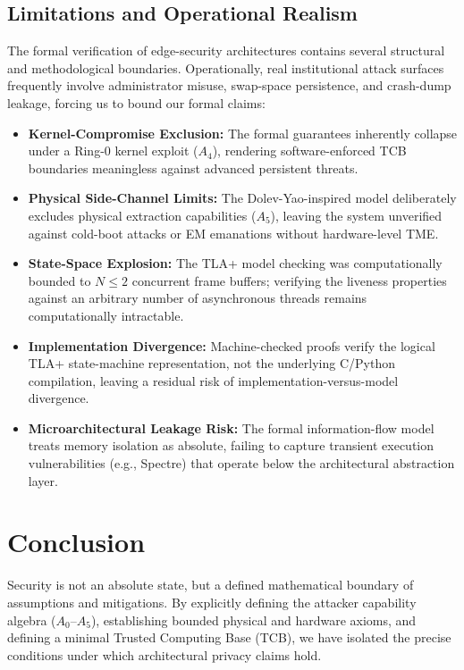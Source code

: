 \documentclass[conference]{IEEEtran}
\begin{document}
\subsection{Limitations and Operational Realism}
The formal verification of edge-security architectures contains several structural and methodological boundaries. Operationally, real institutional attack surfaces frequently involve administrator misuse, swap-space persistence, and crash-dump leakage, forcing us to bound our formal claims:
\begin{itemize}
    \item \textbf{Kernel-Compromise Exclusion:} The formal guarantees inherently collapse under a Ring-0 kernel exploit ($A_4$), rendering software-enforced TCB boundaries meaningless against advanced persistent threats.
    \item \textbf{Physical Side-Channel Limits:} The Dolev-Yao-inspired model deliberately excludes physical extraction capabilities ($A_5$), leaving the system unverified against cold-boot attacks or EM emanations without hardware-level TME.
    \item \textbf{State-Space Explosion:} The TLA+ model checking was computationally bounded to $N \le 2$ concurrent frame buffers; verifying the liveness properties against an arbitrary number of asynchronous threads remains computationally intractable.
    \item \textbf{Implementation Divergence:} Machine-checked proofs verify the logical TLA+ state-machine representation, not the underlying C/Python compilation, leaving a residual risk of implementation-versus-model divergence.
    \item \textbf{Microarchitectural Leakage Risk:} The formal information-flow model treats memory isolation as absolute, failing to capture transient execution vulnerabilities (e.g., Spectre) that operate below the architectural abstraction layer.
\end{itemize}

\section{Conclusion}

Security is not an absolute state, but a defined mathematical boundary of assumptions and mitigations. By explicitly defining the attacker capability algebra ($A_0$--$A_5$), establishing bounded physical and hardware axioms, and defining a minimal Trusted Computing Base (TCB), we have isolated the precise conditions under which architectural privacy claims hold. 
\end{document}

